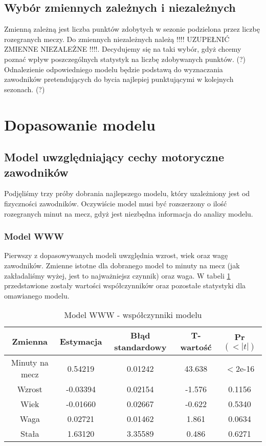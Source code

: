 \documentclass[11pt,a4paper]{article}
\begin{document}
\subsection{Wybór zmiennych zależnych i niezależnych}
	Zmienną zależną jest liczba punktów zdobytych w sezonie podzielona przez liczbę rozegranych meczy. Do zmiennych niezależnych należą !!!! UZUPEŁNIĆ ZMIENNE NIEZALEŻNE !!!!. Decydujemy się na taki wybór, gdyż chcemy poznać wpływ poszczególnych statystyk na liczbę zdobywanych punktów. (?) Odnalezienie odpowiedniego modelu będzie podstawą do wyznaczania zawodników pretendujących do bycia najlepiej punktującymi w kolejnych sezonach. (?)
	
	
\section{Dopasowanie modelu}
\subsection{Model uwzględniający cechy motoryczne zawodników}
Podjęliśmy trzy próby dobrania najlepszego modelu, który uzależniony jest od fizyczności zawodników. Oczywiście model musi być rozszerzony o ilość rozegranych minut na mecz, gdyż jest niezbędna informacja do analizy modelu.

\subsubsection{Model WWW}
Pierwszy z dopasowywanych modeli uwzględnia wzrost, wiek oraz wagę zawodników. Zmienne istotne dla dobranego model to minuty na mecz (jak zakładaliśmy wyżej, jest to najważniejsz czynnik) oraz waga. W tabeli \ref{model_www} przedstawione zostały wartości współczynników oraz pozostałe statystyki dla omawianego modelu. 

\begin{table}[H]
	\begin{tabular}{| c | c | c | c | c |}
		\hline
		Zmienna & Estymacja & Błąd standardowy & T-wartość & Pr$(<|t|)$\\ \hline
		Minuty na mecz & 0.54219 & 0.01242 & 43.638 & $<$2e-16\\ \hline
		Wzrost & -0.03394 & 0.02154 & -1.576 & 0.1156\\ \hline
		Wiek & -0.01660 & 0.02667 & -0.622 & 0.5340\\ \hline 
		Waga & 0.02721 & 0.01462 & 1.861 & 0.0634\\ \hline
		Stała & 1.63120 & 3.35589 & 0.486 & 0.6271 \\ \hline
	\end{tabular}
\caption{Model WWW - współczynniki modelu}
\label{model_www}
\end{table}
	
\end{document}
